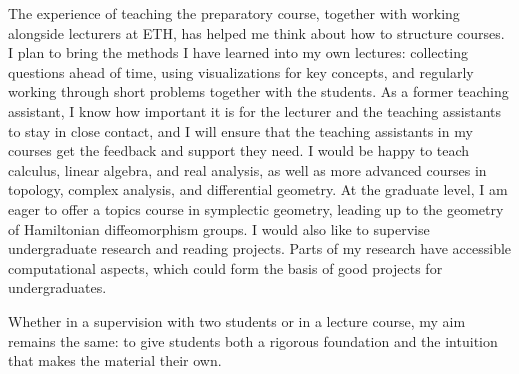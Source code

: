 The experience of teaching the preparatory course, together with working alongside lecturers at ETH, has helped me think about how to structure courses. I plan to bring the methods I have learned into my own lectures:
collecting questions ahead of time, using visualizations for key concepts,
and regularly working through short problems together with the students.
As a former teaching assistant, I know how important it is for the lecturer and the teaching assistants to stay in close contact,
and I will ensure that the teaching assistants in my courses get the feedback and support they need.
I would be happy to teach calculus, linear algebra, and real analysis, as well as more advanced courses in topology, complex analysis, and differential geometry.
At the graduate level, I am eager to offer a topics course in symplectic geometry, leading up to the geometry of Hamiltonian diffeomorphism groups.
I would also like to supervise undergraduate research and reading projects.
Parts of my research have accessible computational aspects, which could form the basis of good projects for undergraduates.

Whether in a supervision with two students or in a lecture course, my aim remains the same: to give students both a rigorous foundation and the intuition that makes the material their own.

